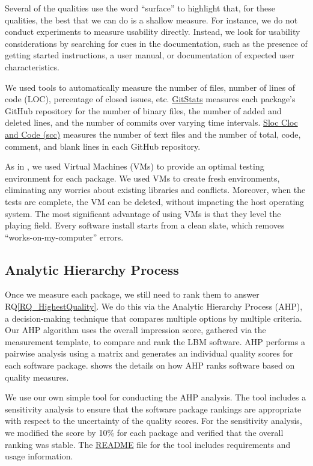\documentclass[final, 3p, times, authoryear]{elsarticle}
\newcommand{\rqref}[1]{RQ\ref{#1}}
\begin{document}
Several of the qualities use the word ``surface'' to highlight that, for these
qualities, the best that we can do is a shallow measure. For instance, we do not
conduct experiments to measure usability directly. Instead, we look for
usability considerations by searching for cues in the documentation, such as the
presence of getting started instructions, a user manual, or documentation of
expected user characteristics. 

We used tools to automatically measure the number of files, number of lines of
code (LOC), percentage of closed issues, etc.
\href{https://github.com/tomgi/git_stats}{GitStats} \citep{Gieniusz2019}
measures each package's GitHub repository for the number of binary files, the
number of added and deleted lines, and the number of commits over varying time
intervals. \href{https://github.com/boyter/scc}{Sloc Cloc and Code (scc)}
\citep{Boyter2021} measures the number of text files and the number of total,
code, comment, and blank lines in each GitHub repository. 

As in \citet{SmithEtAl2016}, we used Virtual Machines (VMs) to provide an
optimal testing environment for each package. We used VMs to create fresh
environments, eliminating any worries about existing libraries and conflicts.
Moreover, when the tests are complete, the VM can be deleted, without impacting
the host operating system. The most significant advantage of using VMs is that
they level the playing field. Every software install starts from a clean slate,
which removes ``works-on-my-computer'' errors.

\subsection{Analytic Hierarchy Process} \label{AHP}

Once we measure each package, we still need to rank them to answer
\rqref{RQ_HighestQuality}. We do this via the Analytic Hierarchy Process (AHP),
a decision-making technique that compares multiple options by multiple criteria.
Our AHP algorithm uses the overall impression score, gathered via the
measurement template, to compare and rank the LBM software. AHP performs a
pairwise analysis using a matrix and generates an individual quality scores for
each software package. \citet{SmithEtAl2016} shows the details on how AHP ranks
software based on quality measures.

We use our own simple tool for conducting the AHP analysis. The tool includes a
sensitivity analysis to ensure that the software package rankings are
appropriate with respect to the uncertainty of the quality scores. For the
sensitivity analysis, we modified the score by 10\% for each package and
verified that the overall ranking was stable.  The
\href{https://github.com/smiths/AIMSS/blob/master/StateOfPractice/AHP2020/LBM/README.txt}{README}
file for the tool includes requirements and usage information.
\end{document}
